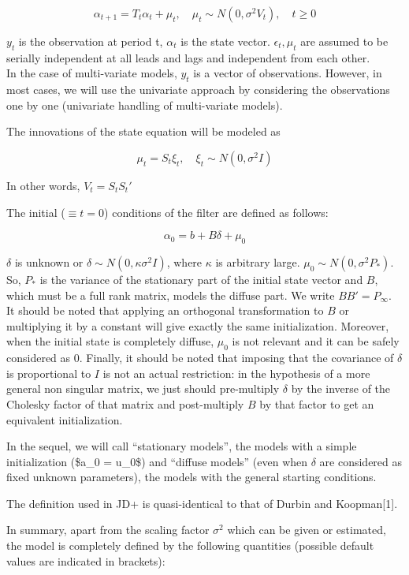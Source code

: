 \documentclass[
  letterpaper,
  DIV=11,
  numbers=noendperiod]{scrreprt}
\begin{document}
\[ \alpha_{t+1} = T_t \alpha_t + \mu_t, \quad \mu_t \sim N \left(0, \sigma^2 V_t \right),\quad t \ge 0 \]

\(y_t\) is the observation at period t, \(\alpha_t\) is the state
vector. \(\epsilon_t, \mu_t\) are assumed to be serially independent at
all leads and lags and independent from each other.\\
In the case of multi-variate models, \(y_t\) is a vector of
observations. However, in most cases, we will use the univariate
approach by considering the observations one by one (univariate handling
of multi-variate models).

The innovations of the state equation will be modeled as

\[ \mu_t = S_t \xi_t, \quad \xi_t \sim N\left( 0, \sigma^2 I\right) \]

In other words, \(V_t=S_t S_t'\)

The initial (\(\equiv t=0\)) conditions of the filter are defined as
follows:

\[ \alpha_{0} = b + B\delta + \mu_{0}\]

\(\delta\) is unknown or
\(\delta \sim N\left(0, \kappa \sigma^2 I \right)\), where \(\kappa\) is
arbitrary large. \(\mu_{0} \sim N\left(0, \sigma^2 P_*\right)\). So,
\(P_*\) is the variance of the stationary part of the initial state
vector and \(B\), which must be a full rank matrix, models the diffuse
part. We write \(BB'=P_\infty\). It should be noted that applying an
orthogonal transformation to \(B\) or multiplying it by a constant will
give exactly the same initialization. Moreover, when the initial state
is completely diffuse, \(\mu_0\) is not relevant and it can be safely
considered as \(0\). Finally, it should be noted that imposing that the
covariance of \(\delta\) is proportional to \(I\) is not an actual
restriction: in the hypothesis of a more general non singular matrix, we
just should pre-multiply \(\delta\) by the inverse of the Cholesky
factor of that matrix and post-multiply \(B\) by that factor to get an
equivalent initialization.

In the sequel, we will call ``stationary models'', the models with a
simple initialization (\$a\_0 = u\_0\$) and ``diffuse models'' (even
when \(\delta\) are considered as fixed unknown parameters), the models
with the general starting conditions.

The definition used in JD+ is quasi-identical to that of Durbin and
Koopman{[}1{]}.

In summary, apart from the scaling factor \(\sigma^2\) which can be
given or estimated, the model is completely defined by the following
quantities (possible default values are indicated in brackets):
\end{document}
